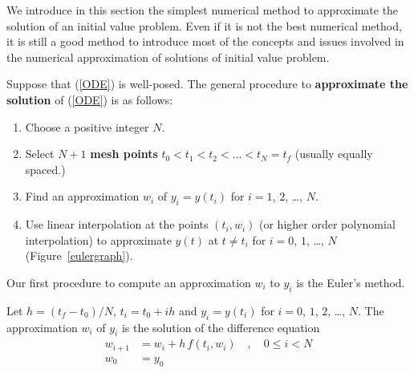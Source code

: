 We introduce in this section the simplest numerical method to
approximate the solution of an initial value problem.  Even if it is
not the best numerical method, it is still a good method to introduce
most of the concepts and issues involved in the numerical
approximation of solutions of initial value problem.

Suppose that (\ref{ODE}) is well-posed.  The general procedure to
{\bfseries approximate the solution} of (\ref{ODE}) is as follows: 
\begin{enumerate}
\item Choose a positive integer $N$.
\item Select $N+1$
{\bfseries mesh points}
$t_0 < t_1 < t_2 < \ldots < t_N = t_f$ (usually equally spaced.)
\item Find an approximation $w_i$ of $y_i = y(t_i)$ for $i=1$,
 $2$, \ldots, $N$.
\item Use linear interpolation at the points $(t_i,w_i)$
 (or higher order polynomial interpolation) to approximate $y(t)$ at
 $t\not=t_i$ for $i=0$, $1$, \ldots, $N$ (Figure~\ref{eulergraph}).
\end{enumerate}

Our first procedure to compute an approximation $w_i$ to $y_i$ is the
Euler's method.

\begin{defn}
Let $h=(t_f-t_0)/N$, $t_i=t_0+ih$ and $y_i = y(t_i)$ for $i=0$,
$1$, $2$, \ldots, $N$.  The approximation $w_i$ of $y_i$ is the
solution of the difference equation
\begin{equation} \label{Euleralgor}
\begin{split}
w_{i+1} & = w_i + h \, f(t_i, w_i) \quad, \quad 0 \leq i < N \\
w_0 & = y_0
\end{split}
\end{equation}
\label{EulerMethod}
\end{defn}


